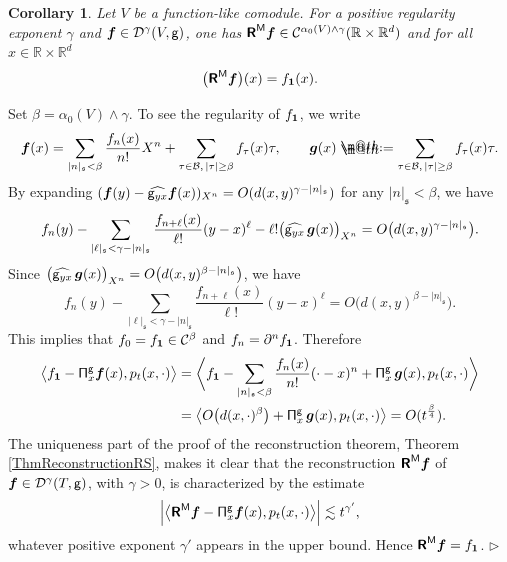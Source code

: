 \documentclass[10pt, reqno]{amsart}
\makeatletter
\numberwithin{subsection}{section}
\numberwithin{subsubsection}{subsection}
\numberwithin{equation}{section} %
\newenvironment{Dem}[1][\unskip]{%
    \begin{list}{\hspace{1.15cm}{\sf \textbf{{\small Proof #1 --}}}}{%
        \setlength{\topsep}{0pt}%
        \setlength{\leftmargin}{0pt}%
        \setlength{\rightmargin}{0pt}%
        \setlength{\listparindent}{0pt}%
        \setlength{\itemindent}{0pt}%
        \setlength{\parsep}{0pt}%
        \addtolength{\leftmargin}{0pt}%
        \addtolength{\rightmargin}{0pt}%
    } \item }{\hfill $\rhd$\end{list}\smallskip}
\theoremstyle{mystyle}
\newtheorem{cor}[thm]{\hspace{-0.15cm}  {Corollary} }%
\theoremstyle{mystyle2}
\theoremstyle{mystyle3}
\newcommand{\bsf}{\boldsymbol{f}}
\newcommand{\bsg}{\boldsymbol{g}}
\newcommand\bbR{\mathbb{R}}
\newcommand{\mcB}{\mathcal{B}}
\newcommand{\mcC}{\mathcal{C}}
\newcommand{\mcD}{\mathcal{D}}
\newcommand*{\defeq}{\mathrel{\rlap{%
                     \raisebox{0.3ex}{$\m@th\cdot$}}%
                     \raisebox{-0.3ex}{$\m@th\cdot$}}%
                     =}
\makeatother
\begin{document}
\medskip

\begin{cor} \label{CorEasyReconstruction}
Let $V$ be a function-like comodule. For a positive regularity exponent $\gamma$ and $\bsf\in\mcD^\gamma(V,{\sf g})$, one has $\textsf{\textbf{R}}^{\sf M}\bsf\in\mcC^{\alpha_0(V) \wedge\gamma}(\bbR\times\bbR^d)$ and for all $x\in\bbR\times\bbR^d$
$$
\big(\textsf{\textbf{R}}^{\sf M}\bsf\big)(x) = f_{\bf1}(x).
$$
\end{cor}

\medskip

\begin{Dem} 
Set $\beta=\alpha_0(V)\wedge\gamma$. To see the regularity of $f_{\bf1}$, we write
$$
\bsf(x)=\sum_{|n|_{\mathfrak{s}}<\beta}\frac{f_n(x)}{n!}X^n+\sum_{\tau\in\mcB,\,|\tau|\geq\beta}f_\tau(x)\tau,\qquad
\bsg(x)\defeq\sum_{\tau\in\mcB,\,|\tau|\geq\beta}f_\tau(x)\tau.
$$
By expanding $(\bsf(y)-\widehat{{\sf g}_{yx}}\bsf(x))_{X^n}=O(d(x,y)^{\gamma-|n|_{\mathfrak{s}}})$ for any $|n|_{\mathfrak{s}}<\beta$, we have
\begin{align*}
f_n(y)-\sum_{|\ell|_{\mathfrak{s}}<\gamma-|n|_{\mathfrak{s}}}\frac{f_{n+\ell}(x)}{\ell!}(y-x)^\ell-\ell!\big(\widehat{{\sf g}_{yx}}\,\bsg(x)\big)_{X^n}
=O\big(d(x,y)^{\gamma-|n|_{\mathfrak{s}}}\big).
\end{align*}
Since $\big(\widehat{{\sf g}_{yx}}\,\bsg(x)\big)_{X^n}=O\big(d(x,y)^{\beta-|n|_{\mathfrak{s}}}\big)$, we have
$$
f_n(y)-\sum_{|\ell|_{\mathfrak{s}}<\gamma-|n|_{\mathfrak{s}}}\frac{f_{n+\ell}(x)}{\ell!}(y-x)^\ell
=O\big(d(x,y)^{\beta-|n|_{\mathfrak{s}}}\big).
$$
This implies that $f_0=f_{\bf1}\in\mcC^\beta$ and $f_n=\partial^nf_{\bf1}$.
Therefore
\begin{align*}
\big\langle f_{\bf1}-{\sf\Pi}_x^{\sf g}\bsf(x),p_t(x,\cdot)\big\rangle
&=\bigg\langle f_{\bf1}-\sum_{|n|_{\mathfrak{s}}<\beta}\frac{f_n(x)}{n!}(\cdot-x)^n+{\sf\Pi}_x^{\sf g}\,\bsg(x),p_t(x,\cdot)\bigg\rangle\\
&=\big\langle O\big(d(x,\cdot)^\beta\big)+{\sf\Pi}_x^{\sf g}\,\bsg(x),p_t(x,\cdot)\big\rangle
=O(t^{\frac\beta4}).
\end{align*}
The uniqueness part of the proof of the reconstruction theorem, Theorem \ref{ThmReconstructionRS}, makes it clear that the reconstruction $\textbf{\textsf{R}}^{\sf M}\bsf$ of $\bsf\in\mcD^\gamma(T,\sf g)$, with $\gamma>0$, is characterized by the estimate
$$
\Big|\big\langle \textsf{\textbf{R}}^{\sf M}\bsf - {\sf\Pi}_x^{\sf g}\bsf(x) , p_t(x,\cdot)\big\rangle\Big|  \lesssim t^{\gamma'},
$$
whatever positive exponent $\gamma'$ appears in the upper bound. Hence $\textsf{\textbf{R}}^{\sf M}\bsf=f_{\bf1}$.
\end{Dem}
\end{document}
